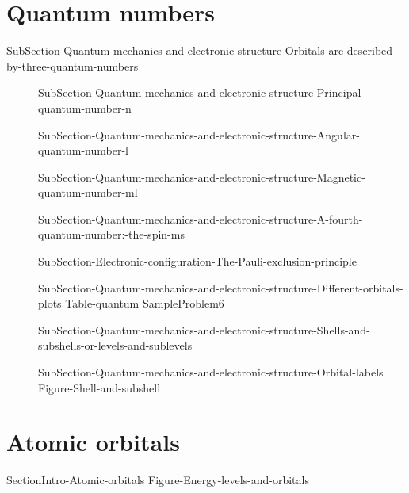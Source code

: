 \documentclass[main.tex]{subfiles}
\begin{document}
\section{Quantum numbers}{SubSection-Quantum-mechanics-and-electronic-structure-Orbitals-are-described-by-three-quantum-numbers}
\sloppy\begin{description}
\item[]{SubSection-Quantum-mechanics-and-electronic-structure-Principal-quantum-number-n}
\item[]{SubSection-Quantum-mechanics-and-electronic-structure-Angular-quantum-number-l}
\item[]{SubSection-Quantum-mechanics-and-electronic-structure-Magnetic-quantum-number-ml}
\item[] {SubSection-Quantum-mechanics-and-electronic-structure-A-fourth-quantum-number:-the-spin-ms}
\item[] {SubSection-Electronic-configuration-The-Pauli-exclusion-principle}
\item[]{SubSection-Quantum-mechanics-and-electronic-structure-Different-orbitals-plots}
{Table-quantum}
{SampleProblem6}
\item[] {SubSection-Quantum-mechanics-and-electronic-structure-Shells-and-subshells-or-levels-and-sublevels}
\item[] {SubSection-Quantum-mechanics-and-electronic-structure-Orbital-labels}
 {Figure-Shell-and-subshell}
\end{description}

 

\section{Atomic orbitals}{SectionIntro-Atomic-orbitals} 
{Figure-Energy-levels-and-orbitals}
\end{document}

